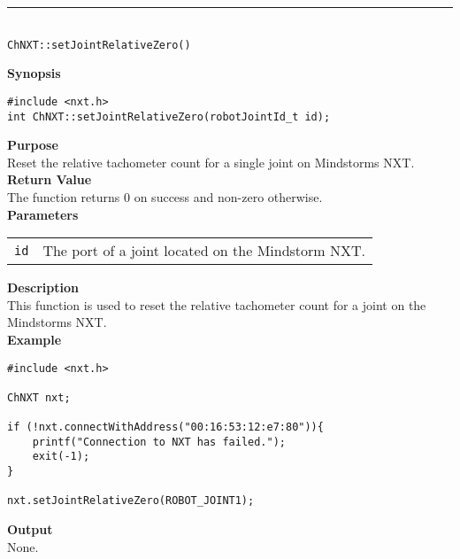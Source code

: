 \noindent
\vspace{5pt}
\rule{4.5in}{0.015in}\\
\noindent
{\LARGE \texttt{ChNXT::setJointRelativeZero()} }\\


\noindent
{\bf Synopsis}
\begin{lstlisting}
#include <nxt.h>
int ChNXT::setJointRelativeZero(robotJointId_t id);
\end{lstlisting}

\noindent
{\bf Purpose}\\
Reset the relative tachometer count for a single joint on Mindstorms NXT.\\

\noindent
{\bf Return Value}\\
The function returns 0 on success and non-zero otherwise.\\

\noindent
{\bf Parameters}\\
\vspace{-0.1in}
\begin{description}
\item
\begin{tabular}{p{20mm}p{135mm}}
\texttt{id} &The port of a joint located on the Mindstorm NXT.\\
\end{tabular}
\end{description}

\noindent
{\bf Description}\\
This function is used to reset the relative tachometer count for a joint on the Mindstorms NXT.\\

\noindent
{\bf Example}
\begin{lstlisting}
#include <nxt.h> 

ChNXT nxt;

if (!nxt.connectWithAddress("00:16:53:12:e7:80")){
    printf("Connection to NXT has failed.");
    exit(-1);
}
    
nxt.setJointRelativeZero(ROBOT_JOINT1);
\end{lstlisting}

\noindent
{\bf Output}\\
None.\\
\\
